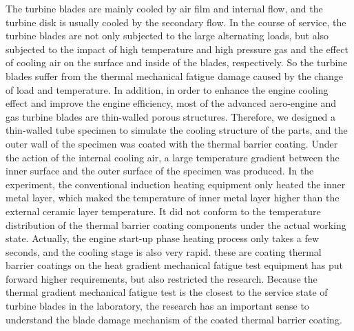 The turbine blades are mainly cooled by air film and internal flow, and the turbine disk is usually cooled by the secondary flow.
In the course of service, the turbine blades are not only subjected to the large alternating loads, but also subjected to the impact of high temperature and high pressure gas and the effect of cooling air on the surface and inside of the blades, respectively. So the turbine blades suffer from the thermal mechanical fatigue damage caused by the change of load and temperature.
In addition, in order to enhance the engine cooling effect and improve the engine efficiency, most of the advanced aero-engine and gas turbine blades are thin-walled porous structures.
Therefore, we designed a thin-walled tube specimen to simulate the cooling structure of the parts, and the outer wall of the specimen was coated with the thermal barrier coating.
Under the action of the internal cooling air, a large temperature gradient between the inner surface and the outer surface of the specimen was produced.
In the experiment, the conventional induction heating equipment only heated the inner metal layer, which maked the temperature of inner metal layer higher than the external ceramic layer temperature. It did not conform to the temperature distribution of the thermal barrier coating components under the actual working state.
Actually, the engine start-up phase heating process only takes a few seconds, and the cooling stage is also very rapid. these are coating thermal barrier coatings on the heat gradient mechanical fatigue test equipment has put forward higher requirements, but also restricted the research.
Because the thermal gradient mechanical fatigue test is the closest to the service state of turbine blades in the laboratory, the research has an important sense to understand the blade damage mechanism of the coated thermal barrier coating.

